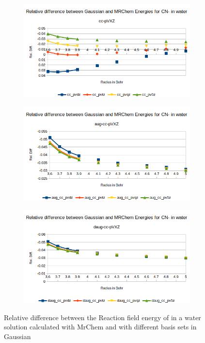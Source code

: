 \documentclass[../master_thesis.tex]{subfiles}
\begin{document}
\begin{figure}[h!]
  \centering
  \begin{subfigure}[b]{0.75\linewidth}
    \includegraphics[width=\linewidth]{img/cyanreldiff.png}
  \end{subfigure}
  \begin{subfigure}[b]{0.75\linewidth}
    \includegraphics[width=\linewidth]{img/cyanaugreldiff.png}
  \end{subfigure}
  \begin{subfigure}[b]{0.75\linewidth}
    \includegraphics[width=\linewidth]{img/cyandaugreldiff.png}
  \end{subfigure}
  \caption{Relative difference between the Reaction field energy of  in a water solution calculated with MrChem
  and with different basis sets in Gaussian}
  \label{fig:cyanreldiff}
\end{figure}
\end{document}
